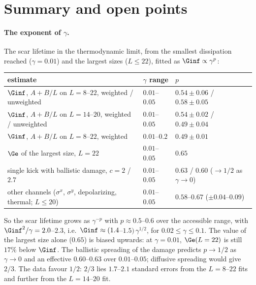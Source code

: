 \section{Summary and open points}
\label{sec:summary}

\paragraph{The exponent of $\gamma$.} The scar lifetime in the thermodynamic limit, from the smallest dissipation reached ($\gamma = 0.01$) and the largest sizes ($L \le 22$), fitted as $\Ginf \propto \gamma^p$:
\begin{center}
\small
\begin{tabular}{lll}
\toprule
estimate & $\gamma$ range & $p$ \\
\midrule
$\Ginf$, $A + B/L$ on $L = 8$--$22$, weighted / unweighted & $0.01$--$0.05$ & $0.54 \pm 0.06$ / $0.58 \pm 0.05$ \\
$\Ginf$, $A + B/L$ on $L = 14$--$20$, weighted / unweighted & $0.01$--$0.05$ & $0.54 \pm 0.02$ / $0.49 \pm 0.04$ \\
$\Ginf$, $A + B/L$ on $L = 8$--$22$, weighted & $0.01$--$0.2$ & $0.49 \pm 0.01$ \\
$\Ge$ of the largest size, $L = 22$ & $0.01$--$0.05$ & $0.65$ \\
single kick with ballistic damage, $c = 2$ / $2.7$ & $0.01$--$0.05$ & $0.63$ / $0.60$ \;($\to 1/2$ as $\gamma \to 0$) \\
other channels ($\sigma^x$, $\sigma^y$, depolarizing, thermal; $L \le 20$) & $0.01$--$0.05$ & $0.58$--$0.67$ ($\pm 0.04$--$0.09$) \\
\bottomrule
\end{tabular}
\end{center}
So the scar lifetime grows as $\gamma^{-p}$ with $p \approx 0.5$--$0.6$ over the accessible range, with $\Ginf^2/\gamma = 2.0$--$2.3$, i.e.\ $\Ginf \approx (1.4$--$1.5)\,\gamma^{1/2}$, for $0.02 \le \gamma \le 0.1$. The value of the largest size alone ($0.65$) is biased upwards: at $\gamma = 0.01$, $\Ge(L = 22)$ is still $17\%$ below $\Ginf$. The ballistic spreading of the damage predicts $p \to 1/2$ as $\gamma \to 0$ and an effective $0.60$--$0.63$ over $0.01$--$0.05$; diffusive spreading would give $2/3$. The data favour $1/2$: $2/3$ lies $1.7$--$2.1$ standard errors from the $L = 8$--$22$ fits and further from the $L = 14$--$20$ fit.

